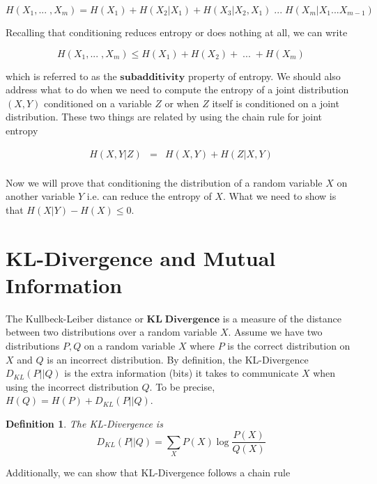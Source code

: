\documentclass[a4paper,11pt]{book}
\newtheorem{definition}{Definition}
\begin{document}
\begin{equation*}
H(X_{1}, ...\;, X_{m}) = H(X_{1}) + H(X_{2}|X_{1}) + H(X_{3}|X_{2},X_{1}) \;...\; H(X_{m}|X_{1} ... X_{m-1}) 
\end{equation*}

Recalling that conditioning reduces entropy or does nothing at all, we can write

\begin{equation*}
H(X_{1}, ...\;, X_{m}) \leq H(X_{1}) + H(X_{2}) +  \;...\; + H(X_{m}) 
\end{equation*}

which is referred to as the $\mathbf{subadditivity}$ property of entropy. We should also address what to do when we need to compute the entropy of a joint distribution $(X,Y)$ conditioned on a variable $Z$ or when $Z$ itself is conditioned on a joint distribution. These two things are related by using the chain rule for joint entropy

\begin{eqnarray*}
H(X,Y|Z) &=& H(X,Y) + H(Z|X,Y)\\
\end{eqnarray*}


Now we will prove that conditioning the distribution of a random variable $X$ on another variable $Y$ i.e. can reduce the entropy of $X$. What we need to show is that $H(X|Y) - H(X) \leq 0$.


\section{KL-Divergence and Mutual Information}

The Kullbeck-Leiber distance or $\mathbf{KL\;Divergence}$ is a measure of the distance between two distributions over a random variable $X$. Assume we have two distributions $P,Q$ on a random variable $X$ where $P$ is the correct distribution on $X$ and $Q$ is an incorrect distribution. By definition, the KL-Divergence $D_{KL}(P||Q)$ is the extra information (bits) it takes to communicate $X$ when using the incorrect distribution $Q$. To be precise, $H(Q) = H(P) + D_{KL}(P||Q)$.

\begin{definition}
The KL-Divergence is 
\begin{equation*}
D_{KL}(P||Q) = \sum_{X} P(X) \log \frac{P(X)}{Q(X)}
\end{equation*}
\end{definition}

Additionally, we can show that KL-Divergence follows a chain rule 
\end{document}
